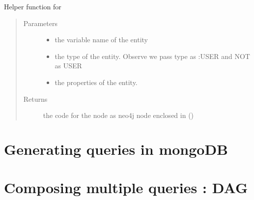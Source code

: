 \documentclass[letterpaper,10pt,english]{sphinxmanual}
\begin{document}
\begin{fulllineitems}
\begin{fulllineitems}
\label{\detokenize{neo4j_query_generation:generate_queries.CreateQuery.generate_node}}
Helper function for {\hyperref[\detokenize{neo4j_query_generation:generate_queries.CreateQuery.conditional_create}]{}}
\begin{quote}\begin{description}
\item[{Parameters}] \leavevmode\begin{itemize}
\item {} 
 \textendash{} the variable name of the entity

\item {} 
 \textendash{} the type of the entity. Observe we pass type as :USER and NOT as USER

\item {} 
 \textendash{} the properties of the entity.

\end{itemize}

\item[{Returns}] \leavevmode
the code for the node as neo4j node enclosed in ()

\end{description}\end{quote}

\end{fulllineitems}


\end{fulllineitems}



\chapter{Generating queries in mongoDB}
\label{\detokenize{mongoDB_query_generation:generating-queries-in-mongodb}}\label{\detokenize{mongoDB_query_generation::doc}}

\chapter{Composing multiple queries : DAG}
\label{\detokenize{dag:composing-multiple-queries-dag}}\label{\detokenize{dag::doc}}
\end{document}
